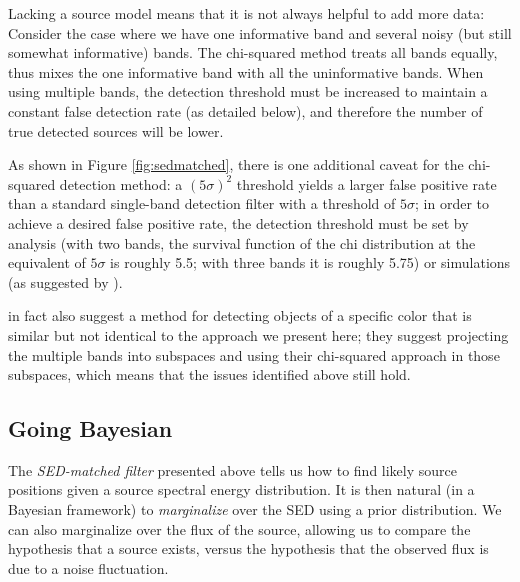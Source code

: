 \documentclass[letterpaper,preprint]{aastex62}
\begin{document}
Lacking a source model means that it is not always helpful to add more
data: Consider the case where we have one informative band and several
noisy (but still somewhat informative) bands.  The chi-squared method
treats all bands equally, thus mixes the one informative band with all
the uninformative bands.  When using multiple bands, the detection
threshold must be increased to maintain a constant false detection
rate (as detailed below), and therefore the number of true detected
sources will be lower.

As shown in Figure \ref{fig:sedmatched}, there is one additional
caveat for the chi-squared detection method: a $(5\sigma)^2$ threshold
yields a larger false positive rate than a standard single-band
detection filter with a threshold of $5\sigma$; in order to achieve a
desired false positive rate, the detection threshold must be set by
analysis (with two bands, the survival function of the chi
distribution at the equivalent of $5 \sigma$ is roughly 5.5; with
three bands it is roughly 5.75) or simulations (as suggested by
\cite{szalay1999}).

\cite{szalay1999} in fact also suggest a method for detecting objects
of a specific color that is similar but not identical to the approach
we present here; they suggest projecting the multiple bands into
subspaces and using their chi-squared approach in those subspaces,
which means that the issues identified above still hold.


\subsection{Going Bayesian}

The \emph{SED-matched filter} presented above tells us how to find
likely source positions given a source spectral energy distribution.
It is then natural (in a Bayesian framework) to \emph{marginalize}
over the SED using a prior distribution.  We can also marginalize over
the flux of the source, allowing us to compare the hypothesis that a
source exists, versus the hypothesis that the observed flux is due to
a noise fluctuation.
\end{document}
